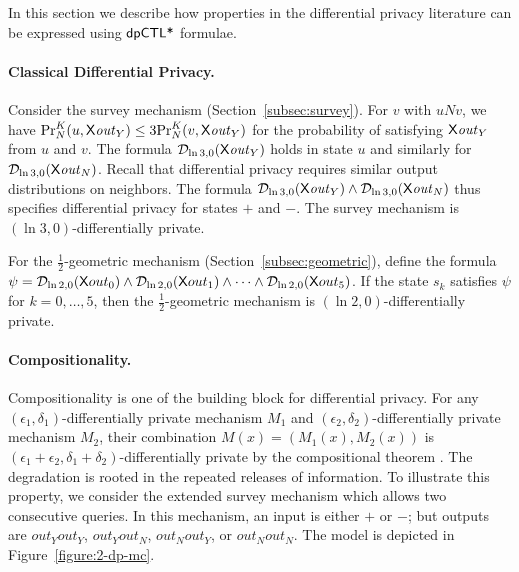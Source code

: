 In this section we describe how properties in the differential privacy literature can be expressed using $\dpCTLstar$ formulae.

\paragraph{Classical Differential Privacy.}
Consider the survey mechanism (Section~\ref{subsec:survey}). For  $v$
with $u N v$, we have $\myPr{u}{K}{N}{\X \mathit{out}_Y}\le
3\myPr{v}{K}{N}{\X \mathit{out}_Y}$ for the probability of satisfying
$\X \mathit{out}_Y$ from $u$ and $v$.
The formula $\dpriv{\ln 3}{0} (\X \mathit{out}_Y)$ holds in state $u$
and similarly for $\dpriv{\ln 3}{0} (\X \mathit{out}_N)$. 
Recall that differential privacy requires similar output distributions
on neighbors. The formula $\dpriv{\ln 3}{0} (\X
\mathit{out}_Y)\wedge \dpriv{\ln 3}{0} (\X \mathit{out}_N)$ thus
specifies differential privacy for states $+$ and $-$. 
The survey mechanism is $(\ln 3, 0)$-differentially private.



For the $\frac{1}{2}$-geometric mechanism (Section~\ref{subsec:geometric}),
define the formula
$\psi = \dpriv{\ln 2}{0} (\X out_0) \wedge \dpriv{\ln 2}{0} (\X out_1) \wedge
\cdots \wedge \dpriv{\ln 2}{0} (\X out_5)$. If the state $s_k$ satisfies
$\psi$ for $k = 0, \ldots, 5$, then the $\frac{1}{2}$-geometric mechanism is
$(\ln 2, 0)$-differentially private.


\paragraph{Compositionality.}
Compositionality is one of the building block for differential privacy. For any $(\epsilon_1,\delta_1)$-differentially private mechanism $M_1$ and
$(\epsilon_2,\delta_2)$-differentially private mechanism $M_2$, their combination $M(x)=(M_1(x), M_2(x))$ is $(\epsilon_1 + \epsilon_2,\delta_1+\delta_2)$-differentially private by the compositional theorem \cite[Theorem 3.16]{DR:14:AFDP}. The degradation is rooted in the repeated releases of information. To illustrate this property, we consider the extended survey mechanism which allows two consecutive queries.
In this mechanism, an input is either $+$ or $-$; but 
outputs are $\mathit{out}_Y\mathit{out}_Y$,
$\mathit{out}_Y\mathit{out}_N$, $\mathit{out}_N\mathit{out}_Y$, or
$\mathit{out}_N\mathit{out}_N$. 
The model is depicted in Figure~\ref{figure:2-dp-mc}.

